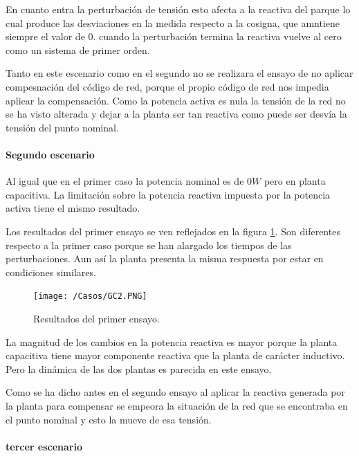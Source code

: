 \documentclass{book}
\begin{document}
En cuanto entra la perturbaci\'on de tensi\'on esto afecta a la reactiva del parque lo cual produce las desviaciones en la medida respecto a la cosigna, que amntiene siempre el valor de 0. cuando la perturbaci\'on termina la reactiva vuelve al cero como un sistema de primer orden. \par 

Tanto en este escenario como en el segundo no se realizara el ensayo de no aplicar compesnaci\'on del c\'odigo de red, porque el propio c\'odigo de red nos impedia aplicar la compensaci\'on. Como la potencia activa es nula la tensi\'on de la red no se ha visto alterada y dejar a la planta ser tan reactiva como puede ser desv\'ia la tensi\'on del punto nominal. \par


	\paragraph{Segundo escenario}

Al igual que en el primer caso la potencia nominal es de $0W$ pero en planta capacitiva. La limitaci\'on sobre la potencia reactiva impuesta por la potencia activa tiene el mismo resultado. \par

Los resultados del primer ensayo se ven reflejados en la figura \ref{GC2}. Son diferentes respecto a la primer caso porque se han alargado los tiempos de las perturbaciones. Aun as\'i la planta presenta la misma respuesta por estar en condiciones similares. \par

\begin{figure}[h!]
\centering
\texttt{[image: /Casos/GC2.PNG]}
\caption{Resultados del primer ensayo. }
\label{GC2}
\end{figure} \par

La magnitud de los cambios en la potencia reactiva es mayor porque la planta capacitiva tiene mayor componente reactiva que la planta de car\'acter inductivo. Pero la din\'amica de las dos plantas es parecida en este ensayo. \par

Como se ha dicho antes en el segundo ensayo al aplicar  la reactiva generada por la planta para compensar se empeora la situaci\'on de la red que se encontraba en el punto nominal y esto la mueve de esa tensi\'on. \par

	\paragraph{tercer escenario}
\end{document}
